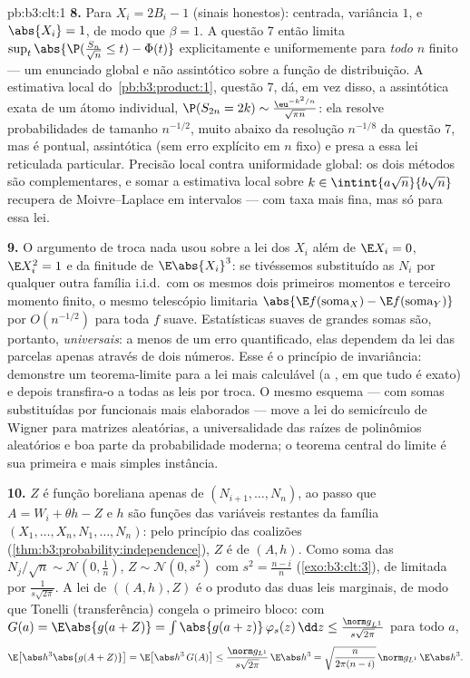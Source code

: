 \begin{solution}{pb:b3:clt:1}
\textbf{8.} Para $X_i = 2B_i - 1$ (sinais honestos): centrada,
variância $1$, e $\abs{X_i} = 1$, de modo que $\beta = 1$. A questão 7
então limita $\sup_t\abs{\P(\frac{S_n}{\sqrt n} \leq t) -
\Phi(t)}$ explicitamente e uniformemente para \emph{todo} $n$
finito --- um enunciado global e não assintótico sobre a
função de distribuição. A estimativa local do~\cref{pb:b3:product:1}, questão 7, dá, em vez disso, a assintótica
exata de um átomo individual, $\P(S_{2n} = 2k) \sim
\frac{\eu^{-k^2/n}}{\sqrt{\pi n}}$: ela resolve
probabilidades de tamanho $n^{-1/2}$, muito abaixo da resolução
$n^{-1/8}$ da questão 7, mas é pontual, assintótica
(sem erro explícito em $n$ fixo) e presa a essa
lei reticulada particular. Precisão local contra
uniformidade global: os dois métodos são complementares, e somar
a estimativa local sobre $k \in \intint{a\sqrt n}{b\sqrt n}$
recupera de Moivre--Laplace em intervalos --- com taxa mais
fina, mas só para essa lei.

\textbf{9.} O argumento de troca nada usou sobre a lei
dos $X_i$ além de $\E X_i = 0$, $\E X_i^2 = 1$ e da
finitude de $\E\abs{X_i}^3$: se tivéssemos substituído as 
$N_i$ por qualquer outra família i.i.d.\ com os mesmos dois primeiros
momentos e terceiro momento finito, o mesmo telescópio
limitaria $\abs{\E f(\text{soma}_X) - \E f(\text{soma}_Y)}$ por
$O(n^{-1/2})$ para toda $f$ suave. Estatísticas suaves de
grandes somas  são, portanto, \emph{universais}: a menos de
um erro quantificado, elas dependem da lei das parcelas apenas
através de dois números. Esse é o princípio de invariância:
demonstre um teorema-limite para a lei mais calculável (a
, em que tudo é exato) e depois transfira-o a
todas as leis por troca. O mesmo esquema --- com somas substituídas
por funcionais mais elaborados --- move a lei do semicírculo
de Wigner para matrizes aleatórias, a universalidade das raízes de
polinômios aleatórios e boa parte da probabilidade moderna; o teorema
central do limite é sua primeira e mais simples instância.

\textbf{10.} $Z$ é função boreliana apenas de $(N_{i+1}, \dots,
N_n)$, ao passo que $A = W_i + \theta h - Z$ e $h$ são
funções das variáveis restantes da família 
$(X_1, \dots, X_n, N_1, \dots, N_n)$: pelo princípio das coalizões (\cref{thm:b3:probability:independence}),
$Z$ é  de $(A, h)$. Como soma das 
$N_j/\sqrt n \sim \mathcal N(0, \frac1n)$, $Z \sim \mathcal
N(0, s^2)$ com $s^2 = \frac{n-i}n$ (\cref{exo:b3:clt:3}),
de  limitada por $\frac1{s\sqrt{2\pi}}$. A lei de
$((A, h), Z)$ é o produto das duas leis marginais, de modo que
Tonelli (transferência) congela o primeiro bloco: com $G(a) =
\E\abs{g(a + Z)} = \int\abs{g(a + z)}\,\varphi_s(z)\,\dd z
\leq \frac{\norm g_{L^1}}{s\sqrt{2\pi}}$ para todo $a$,
\[
\E\bigl[\abs h^3\abs{g(A + Z)}\bigr] =
\E\bigl[\abs h^3\,G(A)\bigr] \leq
\frac{\norm g_{L^1}}{s\sqrt{2\pi}}\,\E\abs h^3
= \sqrt{\frac{n}{2\pi(n-i)}}\,\norm g_{L^1}\,\E\abs h^3 .
\]


\end{solution}
